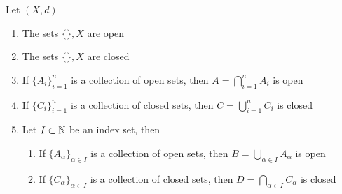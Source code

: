 \documentclass[../complete.tex]{subfiles}
\begin{document}
\begin{prop}
	Let $(X,d)$
	\begin{enumerate}
	\item The sets $\{\},X$ are open
	\item The sets $\{\},X$ are closed
	\item If $\{A_i\}_{i=1}^n$ is a collection of open sets, then $A=\bigcap_{i=1}^nA_i$ is open
	\item If $\{C_i\}_{i=1}^n$ is a collection of closed sets, then $C=\bigcup_{i=1}^nC_i$ is closed
	\item Let $I\subset\mathbb{N}$ be an index set, then
		\begin{enumerate}
		\item If $\{A_\alpha\}_{\alpha\in I}$ is a collection of open sets, then $B=\bigcup_{\alpha\in I}A_\alpha$ is open
		\item If $\{C_\alpha\}_{\alpha\in I}$ is a collection of closed sets, then $D=\bigcap_{\alpha\in I}C_{\alpha}$ is closed
		\end{enumerate}
	\end{enumerate}
\end{prop}
\end{document}
